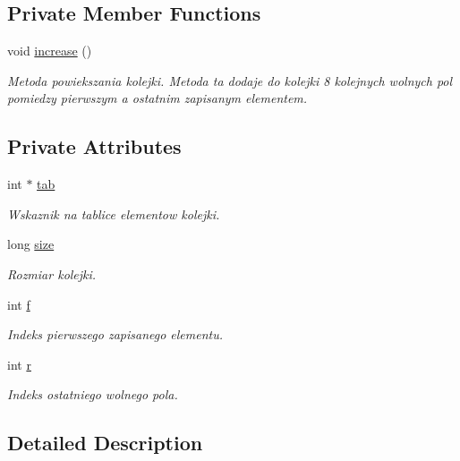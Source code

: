 \subsection*{Private Member Functions}
\begin{DoxyCompactItemize}
\item 
void \hyperlink{class_kolejka_ab4f51f0ec7fef36a85af6cfd1c257427}{increase} ()
\begin{DoxyCompactList}\small\item\em Metoda powiekszania kolejki. Metoda ta dodaje do kolejki 8 kolejnych wolnych pol pomiedzy pierwszym a ostatnim zapisanym elementem. \end{DoxyCompactList}\end{DoxyCompactItemize}
\subsection*{Private Attributes}
\begin{DoxyCompactItemize}
\item 
int $\ast$ \hyperlink{class_kolejka_a49e444e7bd7b91a78bc2a46426b73128}{tab}
\begin{DoxyCompactList}\small\item\em Wskaznik na tablice elementow kolejki. \end{DoxyCompactList}\item 
long \hyperlink{class_kolejka_a84898848de8e77a76a6f2e4a7393b4bb}{size}
\begin{DoxyCompactList}\small\item\em Rozmiar kolejki. \end{DoxyCompactList}\item 
int \hyperlink{class_kolejka_ae66597dc9eb1fcc210b075f8aa7ff77f}{f}
\begin{DoxyCompactList}\small\item\em Indeks pierwszego zapisanego elementu. \end{DoxyCompactList}\item 
int \hyperlink{class_kolejka_ae16213a5b751800eb48da6bede435ad0}{r}
\begin{DoxyCompactList}\small\item\em Indeks ostatniego wolnego pola. \end{DoxyCompactList}\end{DoxyCompactItemize}


\subsection{Detailed Description}


